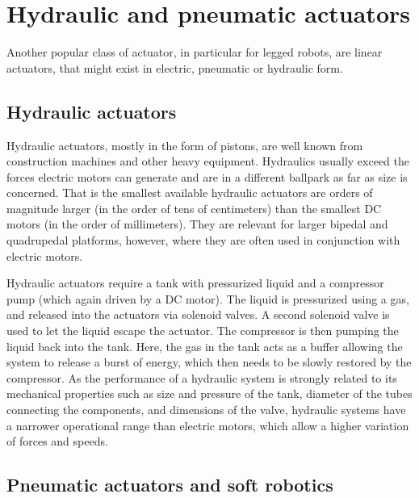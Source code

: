 \section{Hydraulic and pneumatic actuators}
Another popular class of actuator, in particular for legged robots, are linear actuators, that might exist in electric, pneumatic or hydraulic form. 

\subsection{Hydraulic actuators}
Hydraulic actuators, mostly in the form of pistons, are well known from construction machines and other heavy equipment. Hydraulics usually exceed the forces electric motors can generate and are in a different ballpark as far as size is concerned. That is the smallest available hydraulic actuators are orders of magnitude larger (in the order of tens of centimeters) than the smallest DC motors (in the order of millimeters). They are relevant for larger bipedal and quadrupedal platforms, however, where they are often used in conjunction with electric motors. 

Hydraulic actuators require a tank with pressurized liquid and a compressor pump (which again driven by a DC motor). The liquid is pressurized using a gas, and released into the actuators via solenoid valves. A second solenoid valve is used to let the liquid escape the actuator. The compressor is then pumping the liquid back into the tank. Here, the gas in the tank acts as a buffer allowing the system to release a burst of energy, which then needs to be slowly restored by the compressor. As the performance of a hydraulic system is strongly related to its mechanical properties such as size and pressure of the tank, diameter of the tubes connecting the components, and dimensions of the valve, hydraulic systems have a narrower operational range than electric motors, which allow a higher variation of forces and speeds. 

\subsection{Pneumatic actuators and soft robotics}
 

